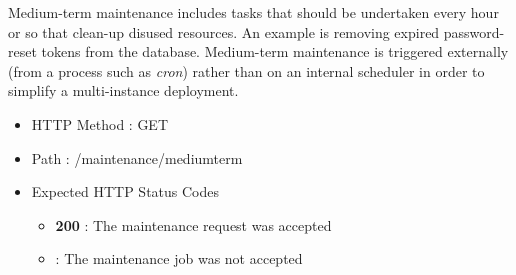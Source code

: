 Medium-term maintenance includes tasks that should be undertaken every hour or so that clean-up disused resources.  An example is removing expired password-reset tokens from the database.  Medium-term maintenance is triggered externally (from a process such as {\it cron}) rather than on an internal scheduler in order to simplify a multi-instance deployment.

\begin{itemize}
\item HTTP Method : GET
\item Path : /maintenance/mediumterm
\item Expected HTTP Status Codes
  \begin{itemize}
  \item {\bf 200} : The maintenance request was accepted
  \item {\bf *} : The maintenance job was not accepted
  \end{itemize}
\end{itemize}




